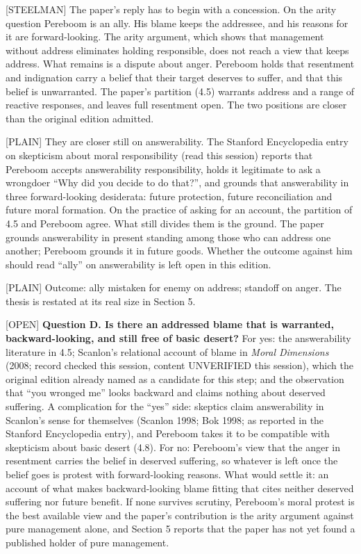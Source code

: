 \documentclass[11pt]{article}
\newcommand{\register}[1]{{\ttfamily\small #1}}
\begin{document}
\register{[STEELMAN]} The paper's reply has to begin with a concession. On the arity question Pereboom is an ally. His blame keeps the addressee, and his reasons for it are forward-looking. The arity argument, which shows that management without address eliminates holding responsible, does not reach a view that keeps address. What remains is a dispute about anger. Pereboom holds that resentment and indignation carry a belief that their target deserves to suffer, and that this belief is unwarranted. The paper's partition (4.5) warrants address and a range of reactive responses, and leaves full resentment open. The two positions are closer than the original edition admitted.

\register{[PLAIN]} They are closer still on answerability. The Stanford Encyclopedia entry on skepticism about moral responsibility (read this session) reports that Pereboom accepts answerability responsibility, holds it legitimate to ask a wrongdoer ``Why did you decide to do that?'', and grounds that answerability in three forward-looking desiderata: future protection, future reconciliation and future moral formation. On the practice of asking for an account, the partition of 4.5 and Pereboom agree. What still divides them is the ground. The paper grounds answerability in present standing among those who can address one another; Pereboom grounds it in future goods. Whether the outcome against him should read ``ally'' on answerability is left open in this edition.

\register{[PLAIN]} Outcome: ally mistaken for enemy on address; standoff on anger. The thesis is restated at its real size in Section 5.

\register{[OPEN]} \textbf{Question D. Is there an addressed blame that is warranted, backward-looking, and still free of basic desert?} For yes: the answerability literature in 4.5; Scanlon's relational account of blame in \emph{Moral Dimensions} (2008; record checked this session, content UNVERIFIED this session), which the original edition already named as a candidate for this step; and the observation that ``you wronged me'' looks backward and claims nothing about deserved suffering. A complication for the ``yes'' side: skeptics claim answerability in Scanlon's sense for themselves (Scanlon 1998; Bok 1998; as reported in the Stanford Encyclopedia entry), and Pereboom takes it to be compatible with skepticism about basic desert (4.8). For no: Pereboom's view that the anger in resentment carries the belief in deserved suffering, so whatever is left once the belief goes is protest with forward-looking reasons. What would settle it: an account of what makes backward-looking blame fitting that cites neither deserved suffering nor future benefit. If none survives scrutiny, Pereboom's moral protest is the best available view and the paper's contribution is the arity argument against pure management alone, and Section 5 reports that the paper has not yet found a published holder of pure management.
\end{document}
